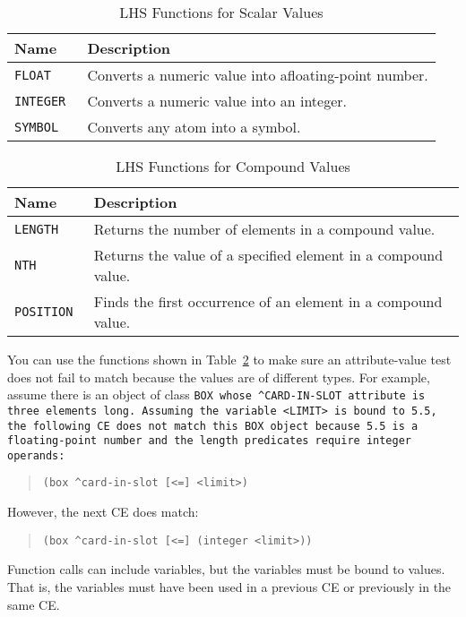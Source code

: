 \begin{table}[h]
  \centering
  \begin{tabular}{ll}
    \toprule
    Name & Description \\
    \midrule
    \tt{FLOAT} &  Converts a numeric value into afloating-point number. \\
    \tt{INTEGER} &  Converts a numeric value into an integer. \\
    \tt{SYMBOL} & Converts any atom into a symbol. \\
    \bottomrule
  \end{tabular}
  \caption{LHS Functions for Scalar Values}
  \label{t:3-4}
\end{table}

\begin{table}[h]
  \centering
  \begin{tabular}{ll}
    \toprule
    Name & Description \\
    \midrule
    \tt{LENGTH} & Returns the number of elements in a compound value. \\
    \tt{NTH} & Returns the value of a specified element in a compound value. \\
    \tt{POSITION} & Finds the first occurrence of an element in a compound value. \\
    \bottomrule
  \end{tabular}
  \caption{LHS Functions for Compound Values}
  \label{t:3-5}
\end{table}

You can use the functions shown in Table~\ref{t:3-5} to make sure an
attribute-value test does not fail to match because the values are of
different types. For example, assume there is an object of class
\tt{BOX} whose \verb|^CARD-IN-SLOT| attribute is three elements
long. Assuming the variable \verb|<LIMIT>| is bound to 5.5, the
following CE does not match this \tt{BOX} object because 5.5 is a
floating-point number and the length predicates require integer
operands:
\begin{quote}
\begin{verbatim}
(box ^card-in-slot [<=] <limit>)
\end{verbatim}
\end{quote}
  However, the next CE does match:
\begin{quote}
\begin{verbatim}
(box ^card-in-slot [<=] (integer <limit>))
\end{verbatim}
\end{quote}
Function calls can include variables, but the variables
  must be bound to values. That is, the variables must
  have been used in a previous CE or previously in the
  same CE.

